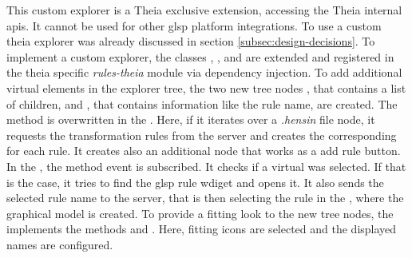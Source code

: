   This custom explorer is a Theia exclusive extension, accessing the Theia internal \acsp{api}. It cannot be used for other \ac{glsp} platform integrations. To use a custom theia explorer was already discussed in section \ref{subsec:design-decisions}. To implement a custom explorer, the classes , , and  are extended and registered in the theia specific \textit{rules-theia} module via dependency injection. To add additional virtual elements in the explorer tree, the two new tree nodes , that contains a list of children, and , that contains information like the rule name, are created. The method  is overwritten in the . Here, if it iterates over a \textit{.hensin} file node, it requests the transformation rules from the server and creates the corresponding  for each rule. It creates also an additional node that works as a \glqq{}add rule\grqq{} button. In the , the method  event is subscribed. It checks if a virtual  was selected. If that is the case, it tries to find the \ac{glsp} rule wdiget and opens it. It also sends the selected rule name to the server, that is then selecting the rule in the , where the graphical model is created. To provide a fitting look to the new tree nodes, the  implements the methods  and . Here, fitting icons are selected and the displayed names are configured.

    